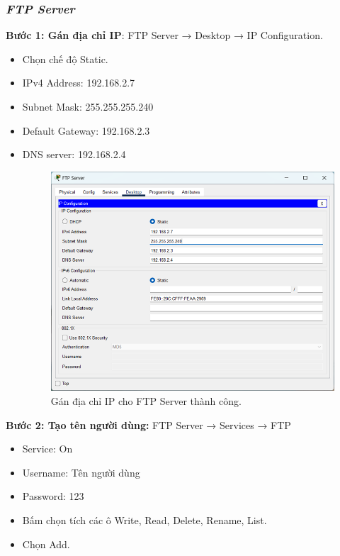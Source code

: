 \documentclass[12pt, a4paper]{article}
\begin{document}
	\subsubsection{\textit{FTP Server}}
	\begin{flushleft}
		\textbf{Bước 1: Gán địa chỉ IP}: FTP Server → Desktop → IP Configuration.
		\begin{itemize}[leftmargin=0.75cm]
			\item Chọn chế độ Static.
			\item IPv4 Address: 192.168.2.7
			\item Subnet Mask: 255.255.255.240
			\item Default Gateway: 192.168.2.3
			\item DNS server: 192.168.2.4
			\begin{figure}[H]
				\centering
				\includegraphics[width=1\textwidth]{ftp_ip.png}
				\caption{Gán địa chỉ IP cho FTP Server thành công.}
			\end{figure}
		\end{itemize}
		\newpage
		\textbf{Bước 2: Tạo tên người dùng:} FTP Server → Services → FTP
		\begin{itemize}[leftmargin=0.75cm]
			\item Service: On
			\item Username: Tên người dùng 
			\item Password: 123
			\item Bấm chọn tích các ô Write, Read, Delete, Rename, List. 
			\item Chọn Add.
			\begin{figure}[H]

\end{figure}
\end{itemize}
\end{flushleft}
\end{document}
